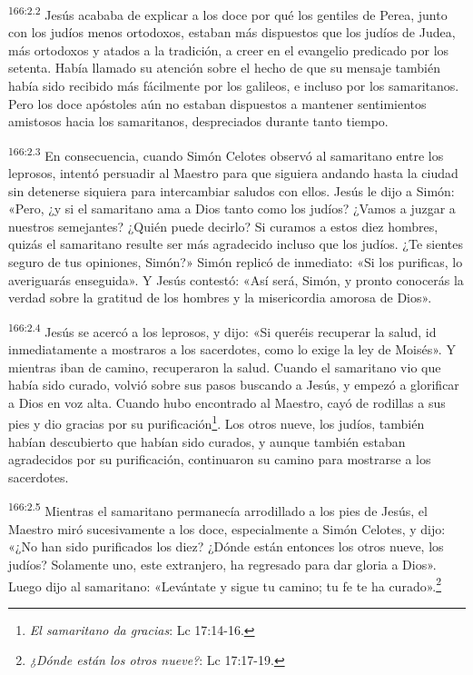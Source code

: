 \par
\textsuperscript{166:2.2} Jesús acababa de explicar a los doce por qué los gentiles de Perea, junto con los judíos menos ortodoxos, estaban más dispuestos que los judíos de Judea, más ortodoxos y atados a la tradición, a creer en el evangelio predicado por los setenta. Había llamado su atención sobre el hecho de que su mensaje también había sido recibido más fácilmente por los galileos, e incluso por los samaritanos. Pero los doce apóstoles aún no estaban dispuestos a mantener sentimientos amistosos hacia los samaritanos, despreciados durante tanto tiempo.

\par
\textsuperscript{166:2.3} En consecuencia, cuando Simón Celotes observó al samaritano entre los leprosos, intentó persuadir al Maestro para que siguiera andando hasta la ciudad sin detenerse siquiera para intercambiar saludos con ellos. Jesús le dijo a Simón: «Pero, ¿y si el samaritano ama a Dios tanto como los judíos? ¿Vamos a juzgar a nuestros semejantes? ¿Quién puede decirlo? Si curamos a estos diez hombres, quizás el samaritano resulte ser más agradecido incluso que los judíos. ¿Te sientes seguro de tus opiniones, Simón?» Simón replicó de inmediato: «Si los purificas, lo averiguarás enseguida». Y Jesús contestó: «Así será, Simón, y pronto conocerás la verdad sobre la gratitud de los hombres y la misericordia amorosa de Dios».

\par
\textsuperscript{166:2.4} Jesús se acercó a los leprosos, y dijo: «Si queréis recuperar la salud, id inmediatamente a mostraros a los sacerdotes, como lo exige la ley de Moisés». Y mientras iban de camino, recuperaron la salud. Cuando el samaritano vio que había sido curado, volvió sobre sus pasos buscando a Jesús, y empezó a glorificar a Dios en voz alta. Cuando hubo encontrado al Maestro, cayó de rodillas a sus pies y dio gracias por su purificación\footnote{\textit{El samaritano da gracias}: Lc 17:14-16.}. Los otros nueve, los judíos, también habían descubierto que habían sido curados, y aunque también estaban agradecidos por su purificación, continuaron su camino para mostrarse a los sacerdotes.

\par
\textsuperscript{166:2.5} Mientras el samaritano permanecía arrodillado a los pies de Jesús, el Maestro miró sucesivamente a los doce, especialmente a Simón Celotes, y dijo: «¿No han sido purificados los diez? ¿Dónde están entonces los otros nueve, los judíos? Solamente uno, este extranjero, ha regresado para dar gloria a Dios». Luego dijo al samaritano: «Levántate y sigue tu camino; tu fe te ha curado».\footnote{\textit{¿Dónde están los otros nueve?}: Lc 17:17-19.}

